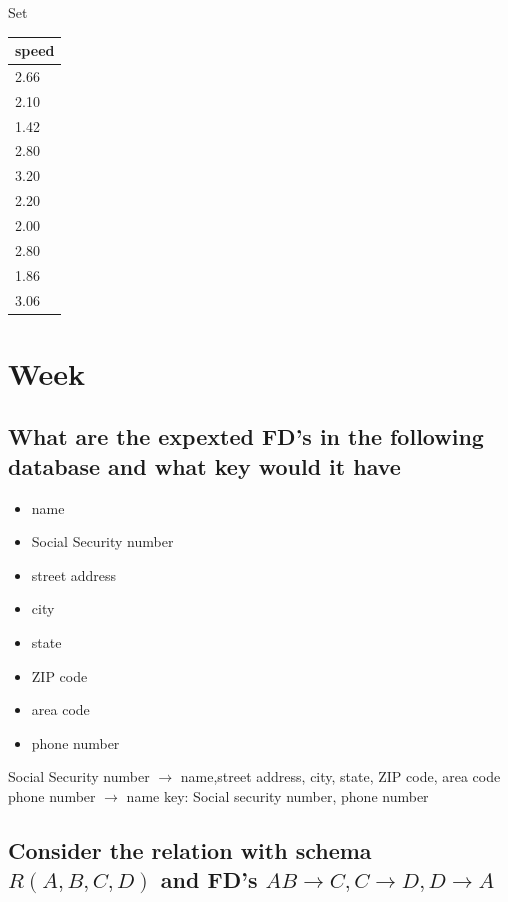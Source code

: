 \documentclass[12pt, a4paper]{article}
\begin{document}
				\begin{minipage}[t]{0.5\textwidth}
				\begin{center}
				Set\\
				\begin{tabular}{|l|}
				\hline
				speed\\\hline
				2.66 \\\hline
				2.10 \\\hline
				1.42 \\\hline
				2.80 \\\hline
				3.20 \\\hline
				2.20 \\\hline
				2.00 \\\hline
				2.80 \\\hline
				1.86 \\\hline
				3.06 \\\hline
				\end{tabular}
				\end{center}
				\end{minipage}
	\section{Week}
		\subsection{What are the expexted FD's in the following database and what key would it have}
			\begin{itemize}
				\item name
				\item Social Security number
				\item street address
				\item city
				\item state
				\item ZIP code
				\item area code
				\item phone number
			\end{itemize}
			Social Security number $\rightarrow$ name,street address, city, state, ZIP code, area code\\
			phone number $\rightarrow$ name
			key: Social security number, phone number
		\subsection{Consider the relation with schema $R(A,B,C,D)$ and FD's $AB\rightarrow C,C\rightarrow D,D\rightarrow A$}
\end{document}
